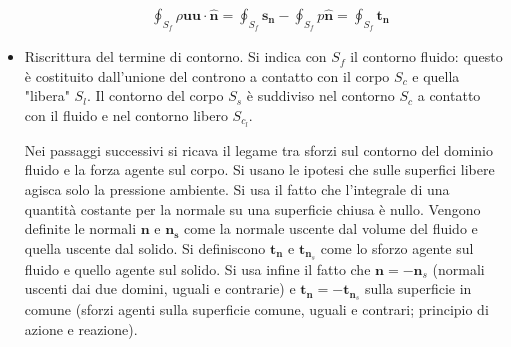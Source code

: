 \begin{itemize}
 
\begin{equation}
\begin{split}
 & \oint_{S_f} \rho \bm{u} \bm{u} \cdot \hat{\bm{n}}= 
 \oint_{S_{f}}  {\bm{s}}_{\bm{n}} - \oint_{S_f} p {\hat{\bm{n}}}
  = \oint_{S_{f}}  {\bm{t}}_{\bm{n}} 
\end{split}
\end{equation}




\item Riscrittura del termine di contorno. Si indica con $S_f$ il contorno fluido: questo è costituito dall'unione del controno a contatto con il corpo $S_c$ e quella "libera" $S_l$. Il contorno del corpo $S_{s}$ è suddiviso nel contorno $S_c$ a contatto con il fluido e nel contorno libero $S_{c_l}$.

Nei passaggi successivi si ricava il legame tra sforzi sul contorno del dominio fluido e la forza agente sul corpo.
Si usano le ipotesi che sulle superfici libere agisca solo la pressione ambiente. Si usa il fatto che l'integrale di una quantità costante per la normale su una superficie chiusa è nullo. Vengono
definite le normali $\bm{n}$ e $\bm{n_s}$ come la normale uscente dal volume del fluido e quella
uscente dal solido. Si definiscono $\bm{t}_{\bm{n}}$ e $\bm{t}_{\bm{n}_{s}}$ come lo sforzo agente sul fluido e quello agente sul solido. Si usa infine il fatto che $\bm{n}=-\bm{n}_{s}$ (normali uscenti dai due domini, uguali e contrarie) e
$\bm{t_n}=-\bm{t}_{\bm{n}_s}$ sulla superficie in comune (sforzi agenti sulla superficie comune, uguali e contrari; principio di azione e reazione).


\end{itemize}
